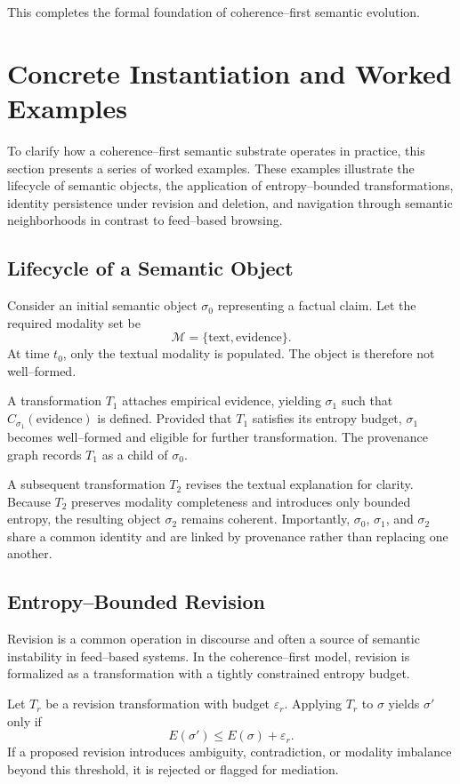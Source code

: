 \documentclass[11pt]{article}
\begin{document}
This completes the formal foundation of coherence--first semantic evolution.

\section{Concrete Instantiation and Worked Examples}

To clarify how a coherence--first semantic substrate operates in practice, this section
presents a series of worked examples. These examples illustrate the lifecycle of semantic
objects, the application of entropy--bounded transformations, identity persistence under
revision and deletion, and navigation through semantic neighborhoods in contrast to
feed--based browsing.

\subsection{Lifecycle of a Semantic Object}

Consider an initial semantic object $\sigma_0$ representing a factual claim. Let the
required modality set be
\[
\mathcal{M} = \{\text{text}, \text{evidence}\}.
\]
At time $t_0$, only the textual modality is populated. The object is therefore not
well--formed.

A transformation $T_1$ attaches empirical evidence, yielding $\sigma_1$ such that
$C_{\sigma_1}(\text{evidence})$ is defined. Provided that $T_1$ satisfies its entropy
budget, $\sigma_1$ becomes well--formed and eligible for further transformation. The
provenance graph records $T_1$ as a child of $\sigma_0$.

A subsequent transformation $T_2$ revises the textual explanation for clarity. Because
$T_2$ preserves modality completeness and introduces only bounded entropy, the resulting
object $\sigma_2$ remains coherent. Importantly, $\sigma_0$, $\sigma_1$, and $\sigma_2$
share a common identity and are linked by provenance rather than replacing one another.

\subsection{Entropy--Bounded Revision}

Revision is a common operation in discourse and often a source of semantic instability in
feed--based systems. In the coherence--first model, revision is formalized as a
transformation with a tightly constrained entropy budget.

Let $T_r$ be a revision transformation with budget $\varepsilon_r$. Applying $T_r$ to
$\sigma$ yields $\sigma'$ only if
\[
E(\sigma') \leq E(\sigma) + \varepsilon_r.
\]
If a proposed revision introduces ambiguity, contradiction, or modality imbalance beyond
this threshold, it is rejected or flagged for mediation.
\end{document}
